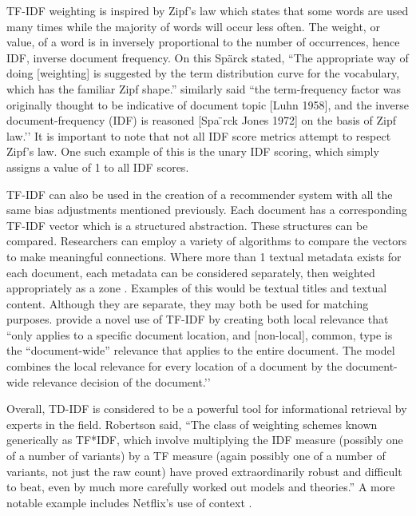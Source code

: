 TF-IDF weighting is inspired by Zipf's law which states that some words are used many times while the majority of words will occur less often. The weight, or value, of a word is in inversely proportional to the number of occurrences, hence IDF, inverse document frequency. On this Sp\"{a}rck stated, ``The appropriate way of doing [weighting] is suggested by the term distribution curve for the vocabulary, which has the familiar Zipf shape.'' \citep{Wu:2008:Interpreting_tf_idf_term_weights} similarly said ``the term-frequency factor was originally thought to be indicative of document topic [Luhn 1958], and the inverse document-frequency (IDF) is reasoned [Spa ̈rck Jones 1972] on the basis of Zipf law.’’ It is important to note that not all IDF score metrics attempt to respect Zipf's law. One such example of this is the unary IDF scoring, which simply assigns a value of 1 to all IDF scores.

TF-IDF can also be used in the creation of a recommender system with all the same bias adjustments mentioned previously. Each document has a corresponding TF-IDF vector which is a structured abstraction. These structures can be compared. Researchers can employ a variety of algorithms to compare the vectors to make meaningful connections. %
Where more than 1 textual metadata exists for each document, each metadata can be considered separately, then weighted appropriately as a zone \citep{manning_raghavan_2008_scoring}. Examples of this would be textual titles and textual content. Although they are separate, they may both be used for matching purposes. \citet{Wu:2008:Interpreting_tf_idf_term_weights} provide a novel use of TF-IDF by creating both local relevance that ``only applies to a specific document location, and [non-local], common, type is the ``document-wide'' relevance that applies to the entire document. The model combines the local relevance for every location of a document by the document-wide relevance decision of the document.’’

Overall, TD-IDF is considered to be a powerful tool for informational retrieval by experts in the field. Robertson \citeyearpar{understanding_idf_2004} said, ``The class of weighting schemes known generically as TF*IDF, which involve multiplying the IDF measure (possibly one of a number of variants) by a TF measure (again possibly one of a number of variants, not just the raw count) have proved extraordinarily robust and difficult to beat, even by much more carefully worked out models and theories.'' A more notable example includes Netflix’s use of context \citep{Bell:2007:lessons_from_the_netflix_prize}.
